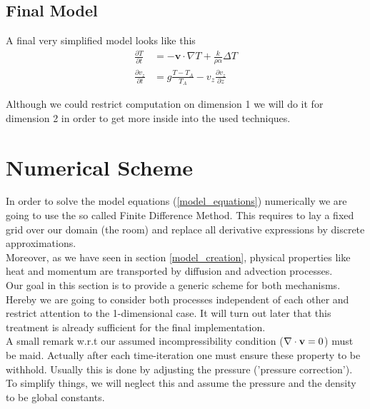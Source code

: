 \documentclass[]{article}
\begin{document}
\subsection{Final Model}

A final very simplified model looks like this
\begin{align} 
\frac{\partial T}{\partial t}&=-\textbf{v}\cdot \nabla T + \frac{k}{\rho\alpha}\Delta T \label{model_equations} \\
\frac{\partial v_{z}}{\partial t}&=g\frac{T-T_{A}}{T_{A}}-v_{z}\frac{\partial v_{z}}{\partial z} \nonumber
\end{align}

Although we could restrict computation on dimension 1 we will do it for dimension 2 in order to
get more inside into the used techniques.


\section{Numerical Scheme}
In order to solve the model equations (\ref{model_equations}) numerically we are going to use the so called Finite Difference Method. This requires to lay a fixed grid over our domain (the room) and replace all derivative expressions by discrete approximations.\\
Moreover, as we have seen in section \ref{model_creation}, physical properties like
heat and momentum are transported by diffusion and advection processes.\\
Our goal in this section is to provide a generic scheme for both mechanisms.
Hereby we are going to consider both processes independent of each other and restrict
attention to the 1-dimensional case. It will turn out later that this treatment is already
sufficient for the final implementation.\\
A small remark w.r.t our assumed incompressibility condition ($\nabla\cdot\textbf v=0$) must be
maid. Actually after each time-iteration one must ensure these property to be withhold. Usually this is done by adjusting the pressure ('pressure correction'). To simplify things, we will neglect this and assume the pressure and the density to be global constants.
\end{document}
